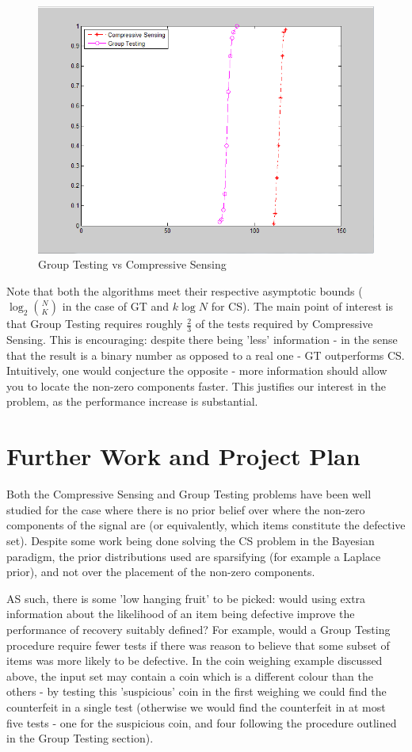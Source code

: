 \documentclass[conference]{IEEEtran}
\begin{document}
\begin{figure}[h]
\centering
\includegraphics[height = 7 cm]{GTvsCS.png}
\caption{Group Testing vs Compressive Sensing}
\label{GTvsCS} 
\end{figure}

Note that both the algorithms meet their respective asymptotic bounds (\( \log_2{N \choose K}\) in the case of GT and \(k\log{N}\) for CS). The main point of interest is that Group Testing requires roughly \(\frac{2}{3}\) of the tests required by Compressive Sensing. This is encouraging: despite there being 'less' information - in the sense that the result is a binary number as opposed to a real one -  GT outperforms CS. Intuitively, one would conjecture the opposite - more information should allow you to locate the non-zero components faster. This justifies our interest in the problem, as the performance increase is substantial. 

\section{Further Work and Project Plan}
Both the Compressive Sensing and Group Testing problems have been well studied for the case where there is no prior belief over where the non-zero components of the signal are (or equivalently, which items constitute the defective set). Despite some work being done solving the CS problem in the Bayesian paradigm, the prior distributions used are sparsifying (for example a Laplace prior), and not over the placement of the non-zero components. 

AS such, there is some 'low hanging fruit' to be picked: would using extra information about the likelihood of an item being defective improve the performance of recovery suitably defined? For example, would a Group Testing procedure require fewer tests if there was reason to believe that some subset of items was more likely to be defective. In the coin weighing example discussed above, the input set may contain a coin which is a different colour than the others  - by testing this 'suspicious' coin in the first weighing we could find the counterfeit in a single test (otherwise we would find the counterfeit in at most five tests - one for the suspicious coin, and four following the procedure outlined in the Group Testing section). 
\end{document}
